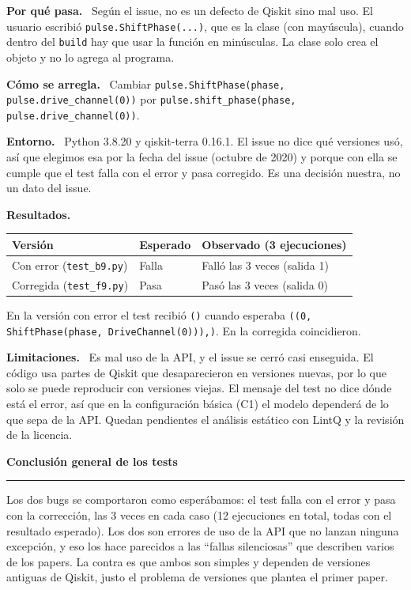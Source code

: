 \documentclass[11pt,a4paper]{article}
\newcommand{\paper}[1]{\vspace{1.2em}\par{\large\textbf{#1}}\par\vspace{0.2em}\hrule\vspace{0.4em}}
\newcommand{\parte}[1]{\par\textbf{#1.}\ }
\begin{document}
\parte{Por qué pasa}
Según el issue, no es un defecto de Qiskit sino mal uso. El usuario escribió \texttt{pulse.ShiftPhase(...)}, que es la clase (con mayúscula), cuando dentro del \texttt{build} hay que usar la función en minúsculas. La clase solo crea el objeto y no lo agrega al programa.

\parte{Cómo se arregla}
Cambiar \texttt{pulse.ShiftPhase(phase, pulse.drive\_channel(0))} por \texttt{pulse.shift\_phase(phase, pulse.drive\_channel(0))}.

\parte{Entorno}
Python 3.8.20 y qiskit-terra 0.16.1. El issue no dice qué versiones usó, así que elegimos esa por la fecha del issue (octubre de 2020) y porque con ella se cumple que el test falla con el error y pasa corregido. Es una decisión nuestra, no un dato del issue.

\parte{Resultados}
\begin{center}
\begin{tabular}{lll}
\toprule
Versión & Esperado & Observado (3 ejecuciones) \\
\midrule
Con error (\texttt{test\_b9.py}) & Falla & Falló las 3 veces (salida 1) \\
Corregida (\texttt{test\_f9.py}) & Pasa & Pasó las 3 veces (salida 0) \\
\bottomrule
\end{tabular}
\end{center}
En la versión con error el test recibió \texttt{()} cuando esperaba \texttt{((0, ShiftPhase(phase, DriveChannel(0))),)}. En la corregida coincidieron.

\parte{Limitaciones}
Es mal uso de la API, y el issue se cerró casi enseguida. El código usa partes de Qiskit que desaparecieron en versiones nuevas, por lo que solo se puede reproducir con versiones viejas. El mensaje del test no dice dónde está el error, así que en la configuración básica (C1) el modelo dependerá de lo que sepa de la API. Quedan pendientes el análisis estático con LintQ y la revisión de la licencia.

\paper{Conclusión general de los tests}
Los dos bugs se comportaron como esperábamos: el test falla con el error y pasa con la corrección, las 3 veces en cada caso (12 ejecuciones en total, todas con el resultado esperado). Los dos son errores de uso de la API que no lanzan ninguna excepción, y eso los hace parecidos a las ``fallas silenciosas'' que describen varios de los papers. La contra es que ambos son simples y dependen de versiones antiguas de Qiskit, justo el problema de versiones que plantea el primer paper.
\end{document}
